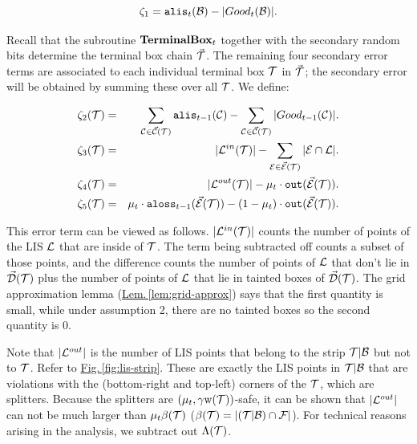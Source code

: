 \documentclass{acmsmall}
\newcommand{\cB}{{\cal B}}
\newcommand{\cC}{{\cal C}}
\newcommand{\cD}{{\cal D}}
\newcommand{\cE}{{\cal E}}
\newcommand{\cF}{{\cal F}}
\newcommand{\cL}{{\cal L}}
\newcommand{\cT}{{\cal T}}
\newcommand{\Fig}[1]{\hyperref[fig:#1]{Fig.\,\ref*{fig:#1}}} %
\newcommand{\Lem}[1]{\hyperref[lem:#1]{Lem.\,\ref*{lem:#1}}} %
\newcommand{\alis}{{\tt alis}}
\newcommand{\aloss}{{\tt aloss}}
\newcommand{\outside}{{\tt out}}
\newcommand{\terminalbox}{{\rm{\bf TerminalBox}}}
\newcommand{\kappaest}{\widehat{\kappa}}
\newcommand{\width}{{\bf {\rm  w}}}
\newcommand{\errorterm}{\zeta}
\begin{document}

$$\errorterm_1 = \alis_t(\cB) - |Good_t(\cB)|.$$ 

	
Recall that the subroutine $\terminalbox_t$ together with the secondary random bits determine the terminal  box chain $\vec{\cT}$.
The remaining four secondary error terms are associated to each individual terminal box $\cT$  in $\vec{\cT}$; the secondary
error will be obtained by summing these over all $\cT$. We define:

\begin{eqnarray*}
\errorterm_2(\cT) & = & \sum_{\cC \in \vec{\cC}(\cT)} \alis_{t-1}(\cC) - \sum_{\cC \in \vec{\cC}(\cT)}|Good_{t-1}(\cC)|.\\
\errorterm_3(\cT) & = & |\cL^{in}(\cT)| - \sum_{\cE \in \vec{\cE}(\cT)} |\cE \cap \cL|.\\
\errorterm_4(\cT) &= &|\cL^{out}(\cT)| - \mu_t \cdot \outside(\vec{\cE}(\cT)).\\
\errorterm_5(\cT)
& = &  \mu_t \cdot \aloss_{t-1}(\vec{\cE}(\cT)) - (1-\mu_t)\cdot \outside(\vec{\cE}(\cT)).
\end{eqnarray*}

\iffalse
This error term can be viewed as follows. $|\cL^{in}(\cT)|$ counts the number of points of the LIS $\cL$ that are inside of $\cT$.  The term being subtracted off counts a subset of those points, and the difference
counts the number of points of $\cL$ that don't lie in $\vec{\cD}(\cT)$ plus the number of points of $\cL$ that lie in tainted boxes of $\vec{\cD}(\cT)$. 
The grid approximation lemma (\Lem{grid-approx}) says that the first quantity is small, while under assumption 2, there are no tainted boxes so the second quantity is 0.
	

	Note that $|\cL^{out}|$ is the number of LIS points that belong to the strip $\cT | \cB$ but not to  $\cT$.
	Refer to \Fig{lis-strip}. These are exactly the LIS points in $\cT | \cB$ that are violations with the (bottom-right and top-left) 
	corners of the $\cT$, which are splitters. Because the splitters are $(\mu_t,\gamma \width(\cT))$-safe, it can be shown that $|\cL^{out}|$ can not be much larger than
	$\mu_t\beta(\cT)$ ($\beta(\cT) = |(\cT|\cB) \cap \cF|$). For technical reasons arising in the analysis, we subtract out $\Lambda(\cT)$.	
\end{document}
